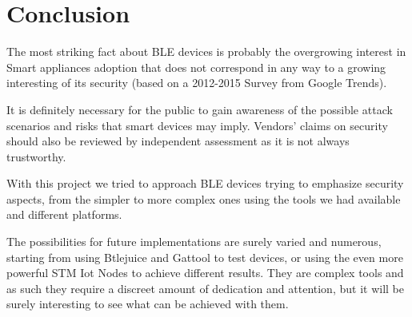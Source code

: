 \chapter{Conclusion}
\label{chapter6}
\thispagestyle{empty}

\noindent 

The most striking fact about BLE devices is probably the overgrowing interest in Smart appliances adoption that does not correspond in any way to a growing interesting of its security (based on a 2012-2015 Survey from Google Trends).

It is definitely necessary for the public to gain awareness of the possible attack scenarios and risks that smart devices may imply.
Vendors' claims on security should also be reviewed by independent assessment as it is not always trustworthy.

With this project we tried to approach BLE devices trying to emphasize security aspects, from the simpler to more complex ones using the tools we had available and different platforms.

The possibilities for future implementations are surely varied and numerous, starting from using Btlejuice and Gattool to test devices, or using the even more powerful STM Iot Nodes to achieve different results.
They are complex tools and as such they require a discreet amount of dedication and attention, but it will be surely interesting to see what can be achieved with them. 